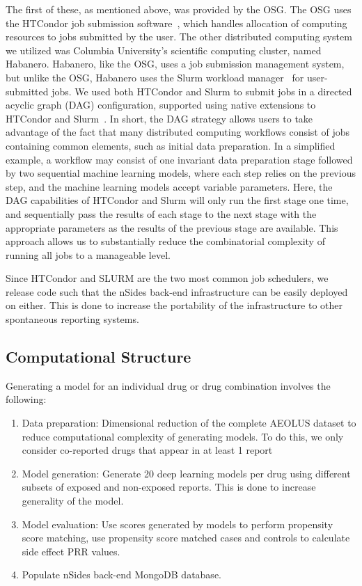 \documentclass{ws-procs11x85}
\begin{document}
The first of these, as mentioned above, was provided by the OSG. The
OSG uses the HTCondor job submission
software~\cite{beowulfbook-condor}, which handles allocation of
computing resources to jobs submitted by the user. The other
distributed computing system we utilized was Columbia University's
scientific computing cluster, named Habanero. Habanero, like the OSG,
uses a job submission management system, but unlike the OSG, Habanero
uses the Slurm workload manager~\cite{slurm} for user-submitted
jobs. We used both HTCondor and Slurm to submit jobs in a directed
acyclic graph (DAG) configuration, supported using native extensions
to HTCondor and Slurm~\cite{dagman}. In short, the DAG strategy allows
users to take advantage of the fact that many distributed computing
workflows consist of jobs containing common elements, such as initial
data preparation. In a simplified example, a workflow may consist of
one invariant data preparation stage followed by two sequential
machine learning models, where each step relies on the previous step,
and the machine learning models accept variable parameters. Here, the
DAG capabilities of HTCondor and Slurm will only run the first stage
one time, and sequentially pass the results of each stage to the next
stage with the appropriate parameters as the results of the previous
stage are available. This approach allows us to substantially reduce
the combinatorial complexity of running all jobs to a manageable
level.

Since HTCondor and SLURM are the two most common job schedulers, we
release code such that the nSides back-end infrastructure can be
easily deployed on either. This is done to increase the portability of
the infrastructure to other spontaneous reporting systems.

\subsection{Computational Structure}
Generating a model for an individual drug or drug combination involves the following:

\begin{enumerate}
\item Data preparation: Dimensional reduction of the complete AEOLUS dataset to reduce computational complexity of generating models. To do this, we only consider co-reported drugs that appear in at least 1 report
\item Model generation: Generate 20 deep learning models per drug using different subsets of exposed and non-exposed reports. This is done to increase generality of the model.
\item Model evaluation: Use scores generated by models to perform propensity score matching, use propensity score matched cases and controls to calculate side effect PRR values.
\item Populate nSides back-end MongoDB database.
\end{enumerate}
\end{document}

